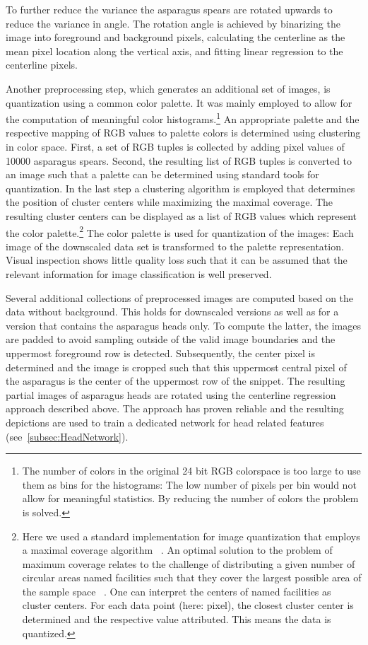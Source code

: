 \bigskip
To further reduce the variance the asparagus spears are rotated upwards to reduce the variance in angle. The rotation angle is achieved by binarizing the image into foreground and background pixels, calculating the centerline as the mean pixel location along the vertical axis, and fitting linear regression to the centerline pixels.

\bigskip
Another preprocessing step, which generates an additional set of images, is quantization using a common color palette. It was mainly employed to allow for the computation of meaningful color histograms.\footnote{ The number of colors in the original 24 bit RGB colorspace is too large to use them as bins for the histograms: The low number of pixels per bin would not allow for meaningful statistics. By reducing the number of colors the problem is solved.}  An appropriate palette and the respective mapping of RGB values to palette colors is determined using clustering in color space. First, a set of RGB tuples is collected by adding pixel values of 10000 asparagus spears. Second, the resulting list of RGB tuples is converted to an image such that a palette can be determined using standard tools for quantization. In the last step a clustering algorithm is employed that determines the position of cluster centers while maximizing the maximal coverage. The resulting cluster centers can be displayed as a list of RGB values which represent the color palette.\footnote{Here we used a standard implementation for image quantization that employs a maximal coverage algorithm ~\citep{pil_quantization}. An optimal solution to the problem of maximum coverage relates to the challenge of distributing a given number of circular areas named facilities such that they cover the largest possible area of the sample space ~\citep{zarandi2011large}. One can interpret the centers of named facilities as cluster centers. For each data point (here: pixel), the closest cluster center is determined and the respective value attributed. This means the data is quantized.} The color palette is used for quantization of the images: Each image of the downscaled data set is transformed to the palette representation. Visual inspection shows little quality loss such that it can be assumed that the relevant information for image classification is well preserved.

\bigskip
Several additional collections of preprocessed images are computed based on the data without background. This holds for downscaled versions as well as for a version that contains the asparagus heads only. To compute the latter, the images are padded to avoid sampling outside of the valid image boundaries and the uppermost foreground row is detected. Subsequently, the center pixel is determined and the image is cropped such that this uppermost central pixel of the asparagus is the center of the uppermost row of the snippet. The resulting partial images of asparagus heads are rotated using the centerline regression approach described above. The approach has proven reliable and the resulting depictions are used to train a dedicated network for head related features (see~\autoref{subsec:HeadNetwork}).


